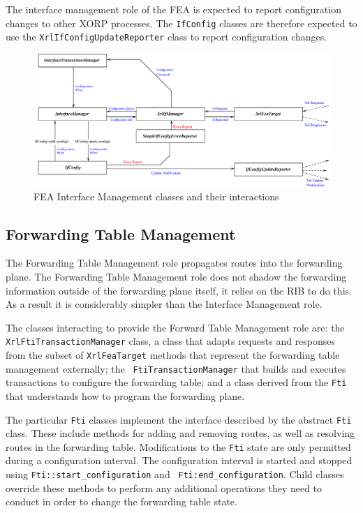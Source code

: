 \documentclass[11pt]{article}
\begin{document}
The interface management role of the FEA is expected to report
configuration changes to other XORP processes.  The {\tt IfConfig}
classes are therefore expected to use the {\tt XrlIfConfigUpdateReporter}
class to report configuration changes.

\clearpage
\begin{figure}
\includegraphics[angle=0,width=\textheight]{figs/ifi}
\caption{\label{fig:ifi}FEA Interface Management classes and their interactions}
\end{figure}
\clearpage

\subsection{Forwarding Table Management}

The Forwarding Table Management role propagates routes into the
forwarding plane.  The Forwarding Table Management role does not
shadow the forwarding information outside of the forwarding plane
itself, it relies on the RIB to do this.  As a result it is
considerably simpler than the Interface Management role.

The classes interacting to provide the Forward Table Management role
are: the {\tt XrlFtiTransactionManager} class, a class that adapts
requests and responses from the subset of {\tt XrlFeaTarget} methods
that represent the forwarding table management externally; the {\tt
FtiTransactionManager} that builds and executes transactions to
configure the forwarding table; and a class derived from the {\tt Fti}
that understands how to program the forwarding plane.

The particular {\tt Fti} classes implement the interface described by
the abstract {\tt Fti} class.  These include methods for adding and
removing routes, as well as resolving routes in the forwarding table.
Modifications to the {\tt Fti} state are only permitted during a
configuration interval.  The configuration interval is started and
stopped using {\tt Fti::start\_configuration} and {\tt
Fti:end\_configuration}.  Child classes override these methods to
perform any additional operations they need to conduct in order to
change the forwarding table state.
\end{document}

